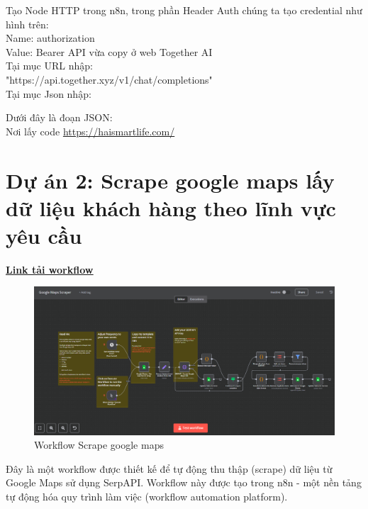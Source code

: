 \begin{itemize}[label=]
\begin{figure}[H]
    \end{figure}

    
 Tạo Node HTTP trong n8n, trong phần Header Auth chúng ta tạo credential như hình trên:\\
 Name: authorization\\
 Value: Bearer API vừa copy ở web Together AI\\
 

Tại mục URL nhập: \\
"https://api.together.xyz/v1/chat/completions"\\

Tại mục Json nhập: 


Dưới đây là đoạn JSON:\\

Nơi lấy code \url{https://haismartlife.com/}


\end{itemize}

\section{\textbf{Dự án 2: Scrape google maps lấy dữ liệu khách hàng theo lĩnh vực yêu cầu }}

\href{https://drive.google.com/drive/folders/1IktM6xKkNLkmaOFLUl4w3Ezc7U0SJUlL?usp=sharing}{\textbf{\underline {Link tải workflow}}}

    \begin{figure}[H]
    \centering
    \includegraphics[width=1\textwidth]{images/2scrape01.png}
    \caption{Workflow Scrape google maps}
    \end{figure}

Đây là một workflow được thiết kế để tự động thu thập (scrape) dữ liệu từ Google Maps sử dụng SerpAPI. Workflow này được tạo trong n8n - một nền tảng tự động hóa quy trình làm việc (workflow automation platform).


